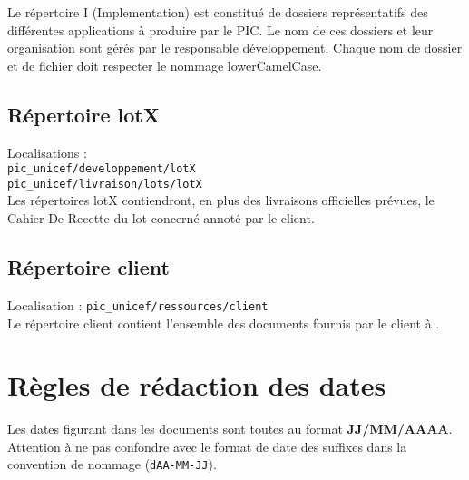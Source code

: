 Le répertoire I (Implementation) est constitué de dossiers représentatifs des différentes applications à produire par le PIC. Le nom de ces dossiers et leur organisation sont gérés par le responsable développement. Chaque nom de dossier et de fichier doit respecter le nommage lowerCamelCase.

\subsection{Répertoire lotX}

Localisations : \\
\verb+pic_unicef/developpement/lotX+\\
\verb+pic_unicef/livraison/lots/lotX+\\

Les répertoires lotX contiendront, en plus des livraisons officielles prévues, le Cahier De Recette du lot concerné annoté par le client.

\subsection{Répertoire client}

Localisation : \verb+pic_unicef/ressources/client+\\

Le répertoire client contient l’ensemble des documents fournis par le client à \nomEquipe.

\section{Règles de rédaction des dates}

Les dates figurant dans les documents sont toutes au format \textbf{JJ/MM/AAAA}. Attention à ne pas confondre avec le format de date des  suffixes dans la convention de nommage (\verb+dAA-MM-JJ+).


